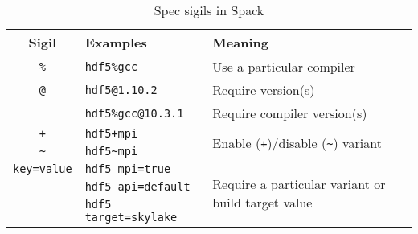 

\begin{table}
  \centering
  \footnotesize
  \begin{tabular}{|c|l|p{3.5cm}|}
    \hline
    \textbf{Sigil} & \textbf{Examples} & \textbf{Meaning} \\
    \hline\hline
    \texttt{\%} & \texttt{hdf5\%gcc}    & Use a particular compiler \\
    \hline
    \texttt{@}  & \texttt{hdf5@1.10.2}  & Require version(s) \\
    & \texttt{hdf5\%gcc@10.3.1} & Require compiler version(s) \\
    \hline
    \texttt{+}  & \texttt{hdf5+mpi}     & \multirow{2}{3.5cm}{Enable (\texttt{+})/disable (\texttt{\~{}}) variant} \\
    \texttt{\~} & \texttt{hdf5\~{}mpi} &    \\
    \hline
    \texttt{key=value} & \texttt{hdf5 mpi=true} & \multirow{3}{3.5cm}{Require a particular variant or build target value} \\
    & \texttt{hdf5 api=default} &      \\
    & \texttt{hdf5 target=skylake} &  \\
    \hline
  \end{tabular}
  \caption[Table caption text]{
    Spec sigils in Spack
    \label{tab:sigil}
  }
\end{table}
